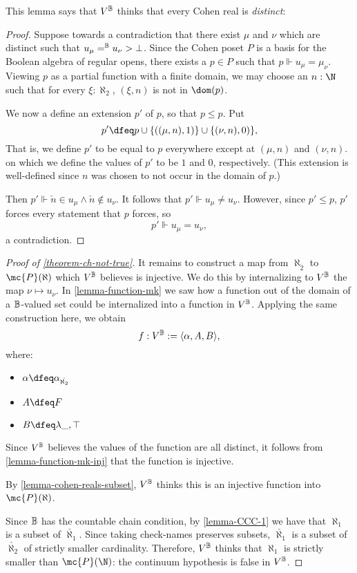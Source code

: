 \documentclass[11pt]{article}
\begin{document}
This lemma says that $V^{\mathbb{B}}$ thinks that every Cohen real is \emph{distinct}:
\begin{proof}
  Suppose towards a contradiction that there exist $\mu$ and $\nu$ which are distinct such that $u_{\mu} =^{\mathbb{B}} u_{\nu} > \bot$. Since the Cohen poset $P$ is a basis for the Boolean algebra of regular opens, there exists a $p \in P$ such that $p \Vdash u_{\mu} = \mu_{\nu}$. Viewing $p$ as a partial function with a finite domain, we may choose an $n : \N$ such that for every $\xi : \aleph_2$, $(\xi, n)$ is not in $\dom(p)$.

  We now a define an extension $p'$ of $p$, so that $p \leq p$. Put
  $$
  p' \dfeq p \cup \{((\mu, n), 1)\} \cup \{(\nu, n), 0)\},
  $$
  That is, we define $p'$ to be equal to $p$ everywhere except at $(\mu, n)$ and $(\nu, n)$.\, on which we define the values of $p'$ to be $1$ and $0$, respectively. (This extension is well-defined since $n$ was chosen to not occur in the domain of $p$.)

  Then $p' \Vdash \check{n} \in u_{\mu} \land \check{n} \not \in u_{\nu}$. It follows that $p' \Vdash u_{\mu} \neq u_{\nu}$. However, since $p' \leq p$, $p'$ forces every statement that $p$ forces, so
  $$
p' \Vdash u_{\mu} = u_{\nu},
$$
a contradiction.
\end{proof}
\begin{proof}[Proof of \ref{theorem-ch-not-true}]
It remains to construct a map from $\aleph_{\check{2}}$ to $\mc{P}(\aleph)$ which $V^{\mathbb{B}}$ believes is injective. We do this by internalizing to $V^{\mathbb{B}}$ the map $\nu \mapsto u_{\nu}$. In \ref{lemma-function-mk} we saw how a function out of the domain of a $\mathbb{B}$-valued set could be internalized into a function in $V^{\mathbb{B}}$. Applying the same construction here, we obtain
$$
f : V^{\mathbb{B}} := \langle \alpha, A, B \rangle,
$$
where:
\begin{itemize}
\item $\alpha \dfeq \alpha_{\check{\aleph_2}}$
\item $A \dfeq F$
\item $B \dfeq \lambda \_, \top$
\end{itemize}

Since $V^{\mathbb{B}}$ believes the values of the function are all distinct, it follows from \ref{lemma-function-mk-inj} that the function is injective.

By \ref{lemma-cohen-reals-subset}, $V^{\mathbb{B}}$ thinks this is an injective function into $\mc{P}(\aleph)$.

Since $\mathbb{B}$ has the countable chain condition, by \ref{lemma-CCC-1} we have that $\aleph_1$ is a subset of $\check{\aleph_1}$. Since taking check-names preserves subsets, $\check{\aleph_1}$ is a subset of $\check{\aleph_2}$ of strictly smaller cardinality. Therefore, $V^{\mathbb{B}}$ thinks that $\aleph_1$ is strictly smaller than $\mc{P}(\N)$: the continuum hypothesis is false in $V^{\mathbb{B}}$.
\end{proof}
\end{document}
